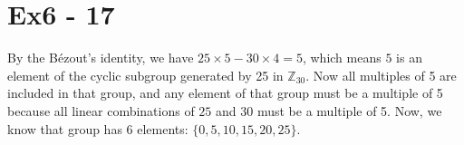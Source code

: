 \section*{Ex6 - 17}

By the Bézout's identity, we have $ 25 \times 5 - 30 \times 4 = 5 $, which means $ 5 $ is an element of the cyclic subgroup generated by 25 in $ \mathbb{Z}_{30} $. Now all multiples of 5 are included in that group, and any element of that group must be a multiple of 5 because all linear combinations of $ 25 $ and $ 30 $ must be a multiple of 5. Now, we know that group has 6 elements: $ \{0, 5, 10, 15, 20, 25\} $.
